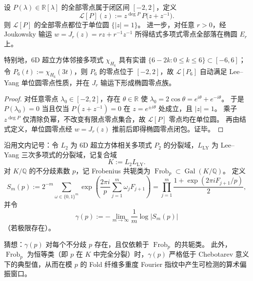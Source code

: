 \begin{theorem}\label{thm:xi-interval-spectrum-leyang-lift-6d-hypercube}
设 \(P(\lambda)\in\mathbb R[\lambda]\) 的全部零点属于闭区间 \([-2,2]\)，定义
\[
\mathcal L[P](z):=z^{\deg P}\,P\!\bigl(z+z^{-1}\bigr).
\]
则 \(\mathcal L[P]\) 的全部零点都位于单位圆 \(\{|z|=1\}\)。
进一步，对任意 \(r>0\)，经 Joukowsky 输运
\(
w=J_r(z)=rz+r^{-1}z^{-1}
\)
所得结式多项式零点全部落在椭圆 \(E_r\) 上。

特别地，6D 超立方体邻接多项式 \(\chi_{H_6}\) 具有实谱 \(\{6-2k:0\le k\le 6\}\subset[-6,6]\)；
令 \(P_6(t):=\chi_{H_6}(3t)\)，则 \(P_6\) 的零点位于 \([-2,2]\)，故
\(
\mathcal L[P_6]
\)
自动满足 Lee--Yang 单位圆零点性质，并在 \(J_r\) 输运下形成椭圆零点族。
\end{theorem}
\begin{proof}
对任意零点 \(\lambda_0\in[-2,2]\)，存在 \(\theta\in\mathbb R\) 使
\(
\lambda_0=2\cos\theta=e^{i\theta}+e^{-i\theta}
\)。
于是 \(P(\lambda_0)=0\) 当且仅当
\(
P(z+z^{-1})=0
\)
在 \(z=e^{\pm i\theta}\) 处成立，且 \(|z|=1\)。
乘子 \(z^{\deg P}\) 仅清除负幂，不改变有限点零点集合，故 \(\mathcal L[P]\) 零点均在单位圆。
再由结式定义，单位圆零点经 \(w=J_r(z)\) 推前后即得椭圆零点闭包。证毕。
\end{proof}

\begin{conjecture}\label{conj:xi-6d-leyang-fold-chebotarev-resonance}
沿用文内记号：令 \(L_2\) 为 6D 超立方体相关多项式 \(P_2\) 的分裂域，\(L_{\mathrm{LY}}\) 为 Lee--Yang 三次多项式的分裂域，记复合域
\[
K:=L_2L_{\mathrm{LY}}.
\]
对 \(K/\mathbb Q\) 的不分歧素数 \(p\)，记 Frobenius 共轭类为
\(
\operatorname{Frob}_p\subset\operatorname{Gal}(K/\mathbb Q)
\)。
定义
\[
S_m(p):=
2^{-m}\sum_{\omega\in\{0,1\}^m}
\exp\!\left(
\frac{2\pi i}{p}\sum_{j=1}^{m}\omega_jF_{j+1}
\right)
=
\prod_{j=1}^{m}\frac{1+\exp(2\pi iF_{j+1}/p)}{2},
\]
并令
\[
\gamma(p):=
-\lim_{m\to\infty}\frac{1}{m}\log|S_m(p)|
\]
（若极限存在）。

猜想：\(\gamma(p)\) 对每个不分歧 \(p\) 存在，且仅依赖于 \(\operatorname{Frob}_p\) 的共轭类。
此外，\(\operatorname{Frob}_p\) 为恒等类（即 \(p\) 在 \(K\) 中完全分裂）时，\(\gamma(p)\) 严格低于 Chebotarev 意义下的典型值，从而在模 \(p\) 的 Fold 纤维多重度 Fourier 指纹中产生可检测的算术偏振窗口。
\end{conjecture}

\endinput
